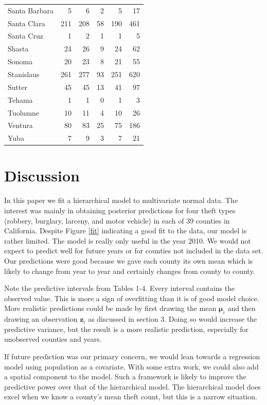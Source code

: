 \documentclass{asaproc}
\newcommand{\m}[1]{\mathbf{\bm{#1}}}
\begin{document}
\begin{table}[p!]
\begin{tabular}{lrrrrr}
  Santa Barbara & 5 & 6 & 2 & 5 & 17 \\ 
  Santa Clara & 211 & 208 & 58 & 190 & 461 \\ 
  Santa Cruz & 1 & 2 & 1 & 1 & 5 \\ 
  Shasta & 24 & 26 & 9 & 24 & 62 \\ 
  Sonoma & 20 & 23 & 8 & 21 & 55 \\ 
  Stanislaus & 261 & 277 & 93 & 251 & 620 \\ 
  Sutter & 45 & 45 & 13 & 41 & 97 \\ 
  Tehama & 1 & 1 & 0 & 1 & 3 \\ 
  Tuolumne & 10 & 11 & 4 & 10 & 26 \\ 
  Ventura & 80 & 83 & 25 & 75 & 186 \\ 
  Yuba & 7 & 9 & 3 & 7 & 21 \\ 
   \hline
\end{tabular}
\end{table}

\section{Discussion}

In this paper we fit a hierarchical model to multivariate normal data. The interest was mainly in obtaining posterior predictions for four theft types (robbery, burglary, larceny, and motor vehicle) in each of 39 counties in California. Despite Figure \ref{fit} indicating a good fit to the data, our model is rather limited. The model is really only useful in the year 2010. We would not expect to predict well for future years or for counties not included in the data set. Our predictions were good because we gave each county its own mean which is likely to change from year to year and certainly changes from county to county.

Note the predictive intervals from Tables 1-4. Every interval contains the observed value. This is more a sign of overfitting than it is of good model choice. More realistic predictions could be made by first drawing the mean $\m{\mu}_i$ and then drawing an observation $\m{z}_i$ as discussed in section 3. Doing so would increase the predictive variance, but the result is a more realistic prediction, especially for unobserved counties and years.

If future prediction was our primary concern, we would lean towards a regression model using population as a covariate. With some extra work, we could also add a spatial component to the model. Such a framework is likely to improve the predictive power over that of the hierarchical model. The hierarchical model does excel when we know a county's mean theft count, but this is a narrow situation.
\end{document}
